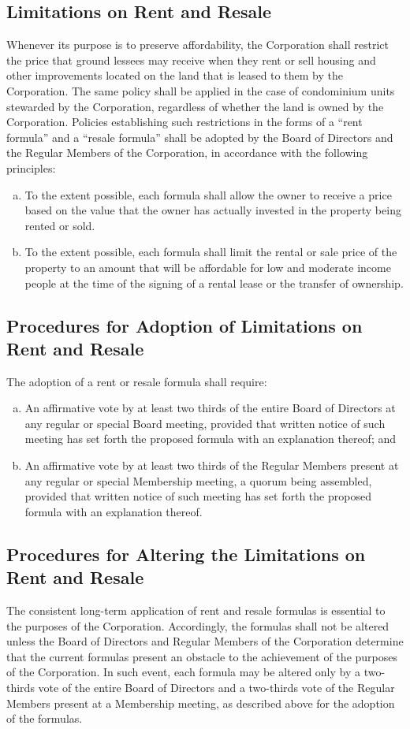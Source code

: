 \subsection{Limitations on Rent and Resale}
Whenever its purpose is to preserve affordability, the Corporation
shall restrict the price that ground lessees may receive when they
rent or sell housing and other improvements located on the land that
is leased to them by the Corporation. The same policy shall be applied
in the case of condominium units stewarded by the Corporation,
regardless of whether the land is owned by the Corporation. Policies
establishing such restrictions in the forms of a ``rent formula'' and
a ``resale formula'' shall be adopted by the Board of Directors and
the Regular Members of the Corporation, in accordance with the
following principles:
\begin{enumerate}[a.]
\item To the extent possible, each formula shall allow the owner to
  receive a price based on the value that the owner has actually
  invested in the property being rented or sold.
\item To the extent possible, each formula shall limit the rental or
  sale price of the property to an amount that will be affordable for
  low and moderate income people at the time of the signing of a
  rental lease or the transfer of ownership.
\end{enumerate}

\subsection{Procedures for Adoption of Limitations on Rent and Resale}
The adoption of a rent or resale formula shall require:
\begin{enumerate}[a.]
\item An affirmative vote by at least two thirds of the entire Board
  of Directors at any regular or special Board meeting, provided that
  written notice of such meeting has set forth the proposed formula
  with an explanation thereof; and
\item An affirmative vote by at least two thirds of the Regular
  Members present at any regular or special Membership meeting, a
  quorum being assembled, provided that written notice of such meeting
  has set forth the proposed formula with an explanation thereof.
\end{enumerate}

\subsection{Procedures for Altering the Limitations on Rent and Resale}
The consistent long-term application of rent and resale formulas is
essential to the purposes of the Corporation. Accordingly, the
formulas shall not be altered unless the Board of Directors and
Regular Members of the Corporation determine that the current formulas
present an obstacle to the achievement of the purposes of the
Corporation. In such event, each formula may be altered only by a
two-thirds vote of the entire Board of Directors and a two-thirds vote
of the Regular Members present at a Membership meeting, as described
above for the adoption of the formulas.


